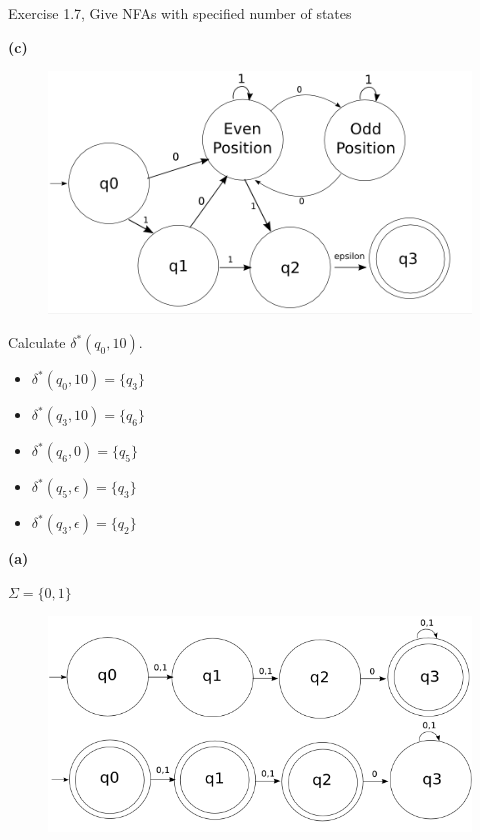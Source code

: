 \documentclass[11pt]{article}
\newcommand{\question}[2] {\vspace{.25in} \fbox{#1} #2 \vspace{.10in}}
\renewcommand{\part}[1] {\vspace{.10in} {\bf (#1)}}
\begin{document}
\question{6}{Exercise 1.7, Give NFAs with specified number of states}

\part{c}
\begin{figure}[h!]
  \begin{center}
    \includegraphics[scale=0.40]{6.png}
  \end{center}
\end{figure}

\question{7}{Calculate ${\delta}^{*}(q_{0}, 10)$.}
\begin{center}
  \begin{itemize}
    \item ${\delta}^{*}(q_{0}, 10) = \{q_{3}\}$
    \item ${\delta}^{*}(q_{3}, 10) = \{q_{6}\}$
    \item ${\delta}^{*}(q_{6},  0) = \{q_{5}\}$
    \item ${\delta}^{*}(q_{5},  {\epsilon}) = \{q_{3}\}$
    \item ${\delta}^{*}(q_{3},  {\epsilon}) = \{q_{2}\}$
  \end{itemize}
\end{center}


\question{8}{}

\part{a}

$\Sigma = \{0,1\}$

\begin{figure}[h!]
  \begin{center}
    \includegraphics[scale=0.40]{8a.png}
  \end{center}
\end{figure}
\end{document}
